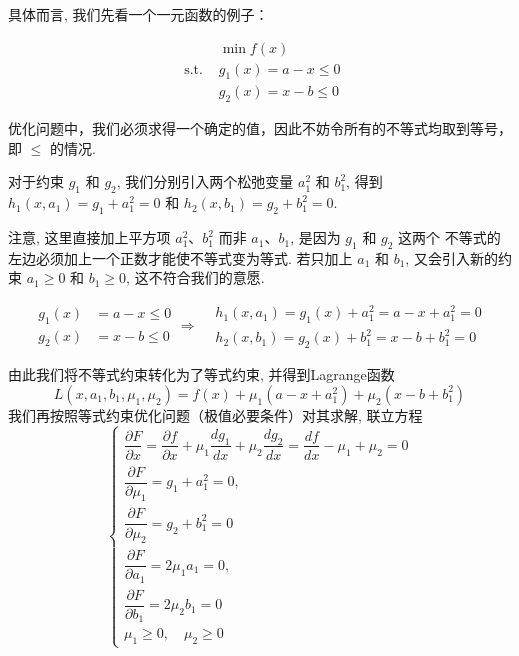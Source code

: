 具体而言, 我们先看一个一元函数的例子：

\begin{example}
    $$\begin{aligned}
        &\min f(x)\\
    \text { s.t. }& g_{1}(x)=a-x \leq 0\\
    &g_{2}(x)=x-b \leq 0
    \end{aligned} $$
\end{example}

\begin{remark}
    优化问题中，我们必须求得一个确定的值，因此不妨令所有的不等式均取到等号，即 $ \leq $ 的情况.
\end{remark}


对于约束 $ g_{1} $ 和 $ g_{2} $, 我们分别引入两个松弛变量 $ a_{1}^{2} $ 和 $ b_{1}^{2} $, 得到 $ h_{1}\left(x, a_{1}\right)=g_{1}+a_{1}^{2}=0 $ 和 $ h_{2}\left(x, b_{1}\right)=g_{2}+b_{1}^{2}=0 $. 

\begin{remark}
    注意, 这里直接加上平方项 $ a_{1}^{2} 、 b_{1}^{2} $ 而非 $ a_{1} 、 b_{1} $, 是因为 $ g_{1} $ 和 $ g_{2} $ 这两个 不等式的左边必须加上一个正数才能使不等式变为等式. 若只加上 $ a_{1} $ 和 $ b_{1} $, 又会引入新的约束 $ a_{1} \geq 0 $ 和 $ b_{1} \geq 0 $, 这不符合我们的意愿.
\end{remark}


$$\begin{aligned}
    g_1(x) &= a - x \le 0 \\
    g_2(x) &= x - b \le 0
\end{aligned} \Rightarrow \begin{aligned}
    &h_{1}\left(x, a_{1}\right)=g_{1}(x)+a_{1}^{2}=a-x+a_{1}^{2}=0\\
    &h_{2}\left(x, b_{1}\right)=g_{2}(x)+b_{1}^{2}=x-b+b_{1}^{2}=0
\end{aligned}$$


由此我们将不等式约束转化为了等式约束, 并得到Lagrange函数
$$
L\left(x, a_{1}, b_{1}, \mu_{1}, \mu_{2}\right)=f(x)+\mu_{1}\left(a-x+a_{1}^{2}\right)+\mu_{2}\left(x-b+b_{1}^{2}\right)
$$
我们再按照等式约束优化问题（极值必要条件）对其求解, 联立方程
$$
\left\{\begin{array}{l}
\dfrac{\partial F}{\partial x}=\dfrac{\partial f}{\partial x}+\mu_{1} \dfrac{d g_{1}}{d x}+\mu_{2} \dfrac{d g_{2}}{d x}=\dfrac{d f}{d x}-\mu_{1}+\mu_{2}=0 \\
\dfrac{\partial F}{\partial \mu_{1}}=g_{1}+a_{1}^{2}=0, \\ 
\dfrac{\partial F}{\partial \mu_{2}}=g_{2}+b_{1}^{2}=0 \\
\dfrac{\partial F}{\partial a_{1}}=2 \mu_{1} a_{1}=0, \\ 
\dfrac{\partial F}{\partial b_{1}}=2 \mu_{2} b_{1}=0 \\
\mu_{1} \geq 0, \quad \mu_{2} \geq 0
\end{array}\right.
$$

